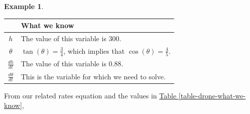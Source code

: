 \documentclass[10pt,oneside,]{book}
\theoremstyle{plain}
\theoremstyle{definition}
\newtheorem{example}[theorem]{Example}
\numberwithin{equation}{section}
\newcounter{figstack}
\newcounter{figindex}
\newlength\fight
\newcommand\pushValignCaptionBottom[5][b]{%
\stepcounter{figstack}%
\expandafter\def\csname %
figalign\romannumeral\value{figstack}\endcsname{#1}%
\expandafter\def\csname %
figtype\romannumeral\value{figstack}\endcsname{#2}%
\expandafter\def\csname %
figwd\romannumeral\value{figstack}\endcsname{#3}%
\expandafter\def\csname %
figcontent\romannumeral\value{figstack}\endcsname{#4}%
\expandafter\def\csname %
figcap\romannumeral\value{figstack}\endcsname{#5}%
\setbox0=\hbox{%
\begin{#2}{#3}#4\end{#2}}%
\ifdim\dimexpr\ht0+\dp0\relax>\fight\global\setlength{\fight}{%
\dimexpr\ht0+\dp0\relax}\fi%
}
\newcommand\popValignCaptionBottom{%
\setcounter{figindex}{0}%
\hfill%
\whiledo{\value{figindex}<\value{figstack}}{%
\stepcounter{figindex}%
\def\tmp{\csname figwd\romannumeral\value{figindex}\endcsname}%
\begin{\csname figtype\romannumeral\value{figindex}\endcsname}[t]{\tmp}%
\centering%
\stackinset{c}{}%
{\csname figalign\romannumeral\value{figindex}\endcsname}{}%
{\csname figcontent\romannumeral\value{figindex}\endcsname}%
{\rule{0pt}{\fight}}\par%
\csname figcap\romannumeral\value{figindex}\endcsname%
\end{\csname figtype\romannumeral\value{figindex}\endcsname}%
\hfill%
}%
\setcounter{figstack}{0}%
\setlength{\fight}{0pt}%
\hfill%
}
\newcommand{\fe}[2]{#1\mathopen{}\left(#2\right)\mathclose{}}
\newcommand{\lz}[2]{\frac{d#1}{d#2}}
\newcommand{\lzoo}[2]{{\frac{d}{d#1}}{\left(#2\right)}}
\begin{document}
\begin{example}
\begin{table}
\begin{tabular}{cp{3.5in}c}
\bottomrule
\end{tabular}
\end{table}
\begin{figure}
\centering
\pushValignCaptionBottom[b]{minipage}{.50\textwidth}{%
\pgfplotsset{every axis/.append style={width=0.9\linewidth}}%
\centering%
{
\begin{tikzpicture}
\coordinate (O) at (0,0);
\coordinate (A) at (4,0);
\coordinate (B) at (4,2);
\draw (O)--(A)--(B)--cycle;
\tkzLabelSegment[below=2pt](O,A){$400$}
\tkzLabelSegment[right=2pt](A,B){$h$}
\tkzMarkAngle(A,O,B)
\tkzLabelAngle[pos = 0.8](A,O,B){$\theta$}
\end{tikzpicture}
}
}%
{\captionof{figure}{Variable Diagram\label{figure-85}}
}%
\pushValignCaptionBottom[b]{minipage}{.50\textwidth}{%
\pgfplotsset{every axis/.append style={width=0.9\linewidth}}%
\parbox{\textwidth}{%
\setlength{\parskip}{0.5pc}%
\begin{align*}
\fe{\tan}{\theta}&=\frac{h}{400}\\
\lzoo{t}{\fe{\tan}{\theta}}&=\lzoo{t}{\frac{h}{400}}\\
\fe{\sec^2}{\theta}\lz{\theta}{t}&=\frac{1}{400}\lz{h}{t}
\end{align*}This is our related rates equation.%
}%
}%
{}%
\popValignCaptionBottom
\end{figure}
\par
At the moment the drone is \SI{300}{\foot} above the ground and rising at a rate of \SI{0.88}{\foot\per\second}.%
\begin{table}
\centering
\caption{What we know about the variables at the described moment\label{table-drone-what-we-know}}
\begin{tabular}{cp{4in}}
\toprule
Variable&What we know\\
\midrule
\(h\)&The value of this variable is \(300\).\\
\midrule
\(\theta\)&\(\fe{\tan}{\theta}=\frac{3}{4}\), which implies that \(\fe{\cos}{\theta}=\frac{4}{5}\).\\
\midrule
\(\lz{h}{t}\)&The value of this variable is \(0.88\).\\
\midrule
\(\lz{\theta}{t}\)&This is the variable for which we need to solve.\\
\bottomrule
\end{tabular}
\end{table}
\par
From our related rates equation and the values in \hyperref[table-drone-what-we-know]{Table \ref{table-drone-what-we-know}},%

\end{example}
\end{document}
